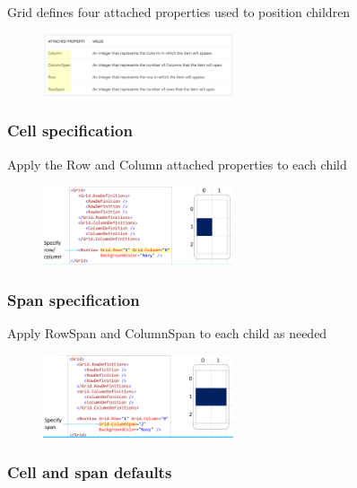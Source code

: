 \documentclass{article}
\begin{document}
Grid defines four attached properties used to position children

\begin{figure}[H]
    \centering
    \includegraphics[width=0.5\textwidth]{xaml-grid-pos-props.png}
    \caption{}
\end{figure}

\subsubsection{Cell specification}

Apply the Row and Column attached properties to each child

\begin{figure}[H]
    \centering
    \includegraphics[width=0.5\textwidth]{xaml-grid-cells.png}
    \caption{}
\end{figure}

\subsubsection{Span specification}

Apply RowSpan and ColumnSpan to each child as needed

\begin{figure}[H]
    \centering
    \includegraphics[width=0.5\textwidth]{xaml-grid-span.png}
    \caption{}
\end{figure}

\subsubsection{Cell and span defaults}
\end{document}
